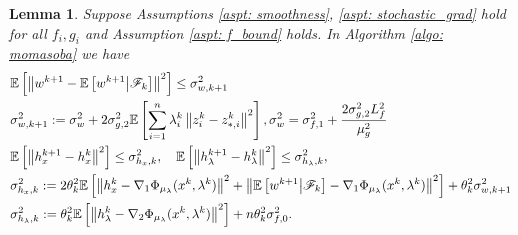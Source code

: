 \documentclass[10pt]{article}
\newtheorem{lemma}{Lemma}[section]
\theoremstyle{remark}
\def\setF{\mathscr{F}} %
\newcommand{\E}{\mathbb{E}}
\newcommand{\norm}[1]{\left\|#1\right\|}
\begin{document}
\begin{lemma}\label{lem: variance}
    Suppose Assumptions \ref{aspt: smoothness}, \ref{aspt: stochastic_grad} hold for all $f_i, g_i$ and Assumption \ref{aspt: f_bound} holds. In Algorithm \ref{algo: momasoba} we have
    \begin{align}
        &\E\left[\norm{w^{k+1} - \E\left[w^{k+1}\middle|\setF_k\right]}^2\right] \leq \sigma_{w,k+1}^2 \notag\\
        &\sigma_{w,k+1}^2 := \sigma_w^2 + 2\sigma_{g,2}^2\E\left[\sum_{i=1}^{n}\lambda_i^k\norm{z_i^k - z_{*,i}^k}^2\right], \sigma_w^2 = \sigma_{f,1}^2 + \frac{2\sigma_{g,2}^2L_f^2}{\mu_g^2}\label{ineq: w_var}\\
        &\E\left[\norm{h_x^{k+1} - h_x^k}^2\right]\leq \sigma_{h_x, k}^2,\quad \E\left[\norm{h_{\lambda}^{k+1} - h_{\lambda}^k}^2\right]\leq \sigma_{h_{\lambda}, k}^2, \label{ineq: h_var} \\
        &\sigma_{h_x, k}^2 := 2\theta_k^2\E\left[\norm{h_x^k - \nabla_1\Phi_{\mu_{\lambda}}(x^k,\lambda^k)}^2 + \norm{\E\left[w^{k+1}\middle|\setF_k\right] -\nabla_1\Phi_{\mu_{\lambda}}(x^k, \lambda^k) }^2\right] +\theta_k^2\sigma_{w,k+1}^2 \notag\\
        &\sigma_{h_{\lambda}, k}^2 :=\theta_k^2\E\left[\norm{h_{\lambda}^k - \nabla_2\Phi_{\mu_{\lambda}}(x^k,\lambda^k)}^2\right] + n\theta_k^2\sigma_{f,0}^2.
    \end{align}
\end{lemma}
\end{document}
